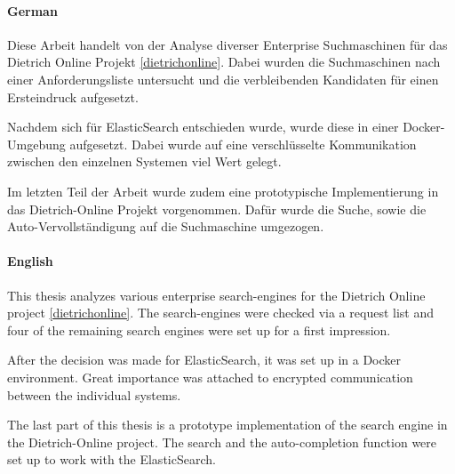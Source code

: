 \kurzfassung

\paragraph*{German}
Diese Arbeit handelt von der Analyse diverser Enterprise Suchmaschinen für das Dietrich Online Projekt \ref{dietrichonline}. Dabei wurden die Suchmaschinen nach einer Anforderungsliste untersucht und die verbleibenden Kandidaten für einen Ersteindruck aufgesetzt. 

Nachdem sich für ElasticSearch entschieden wurde, wurde diese in einer Docker-Umgebung aufgesetzt. Dabei wurde auf eine verschlüsselte Kommunikation zwischen den einzelnen Systemen viel Wert gelegt.

Im letzten Teil der Arbeit wurde zudem eine prototypische Implementierung in das Dietrich-Online Projekt vorgenommen. Dafür wurde die Suche, sowie die Auto-Vervollständigung auf die Suchmaschine umgezogen.

\paragraph*{English}

This thesis analyzes various enterprise search-engines for the Dietrich Online project \ref{dietrichonline}. The search-engines were checked via a request list and four of the remaining search engines were set up for a first impression.

After the decision was made for ElasticSearch, it was set up in a Docker environment. Great importance was attached to encrypted communication between the individual systems.

The last part of this thesis is a prototype implementation of the search engine in the Dietrich-Online project. The search and the auto-completion function were set up to work with the ElasticSearch.